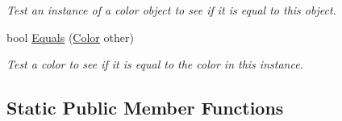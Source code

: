 \begin{DoxyCompactItemize}
\begin{DoxyCompactList}\small\item\em Test an instance of a color object to see if it is equal to this object.\end{DoxyCompactList}\item 
bool \hyperlink{struct_microsoft_1_1_xna_1_1_framework_1_1_color_aa7a79bcebeccb46df4516a9f77e0a4a0}{Equals} (\hyperlink{struct_microsoft_1_1_xna_1_1_framework_1_1_color}{Color} other)
\begin{DoxyCompactList}\small\item\em Test a color to see if it is equal to the color in this instance.\end{DoxyCompactList}\end{DoxyCompactItemize}
\subsection*{Static Public Member Functions}
